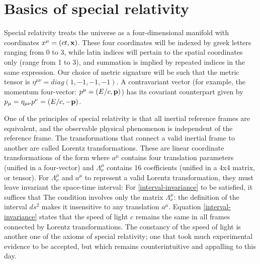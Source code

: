 \documentclass[12pt,a4paper,notitlepage]{report}
\begin{document}
\section{Basics of special relativity}

Special relativity treats the universe as a four-dimensional manifold with coordinates $x^\mu = (ct,\vb{x})$. These four coordinates will be indexed by greek letters ranging from 0 to 3, while latin indices will pertain to the spatial coordinates only (range from 1 to 3), and summation is implied by repeated indices in the same expression. Our choice of metric signature will be such that the metric tensor is $\eta^{\mu\nu} = diag(1,-1,-1,-1)$. A contravariant vector (for example, the momentum four-vector: $p^\mu = (E/c, \vb{p})$) has its covariant counterpart given by $p_\mu = \eta_{\mu\nu}p^\nu = (E/c, -\vb{p})$.

One of the principles of special relativity is that all inertial reference frames are equivalent, and the observable physical phenomenon is independent of the reference frame. The transformations that connect a valid inertial frame to another are called Lorentz transformations. These are linear coordinate transformations of the form
%
%
where $a^\mu$ contains four translation parameters (unified in a four-vector) and $\Lambda_\nu^\mu$ contains 16 coefficients (unified in a 4x4 matrix, or tensor).
For $\Lambda_\nu^\mu$ and $a^\mu$ to represent a valid Lorentz transformation, they must leave invariant the space-time interval:
%
%
For \eqref{interval-invariance} to be satisfied, it suffices that 
%
%
The condition involves only the matrix $\Lambda_\nu^\mu$: the definition of the interval $d s^2$ makes it insensitive to any translation $a^\mu$.
Equation \eqref{interval-invariance} states that the speed of light $c$ remains the same in all frames connected by Lorentz transformations. The constancy of the speed of light is another one of the axioms of special relativity; one that took much experimental evidence to be accepted, but which remains counterintuitive and appalling to this day.
\end{document}
